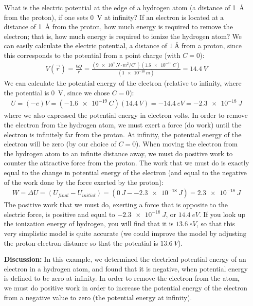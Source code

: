 \begin{example}{What is the electric potential at the edge of a hydrogen atom (a distance of \SI{1}{\angstrom} from the proton), if one sets \SI{0}{V} at infinity? If an electron is located at a distance of \SI{1}{\angstrom} from the proton, how much energy is required to remove the electron; that is, how much energy is required to ionize the hydrogen atom?}
We can easily calculate the electric potential, a distance of $\SI{1}{\angstrom}$ from a proton, since this corresponds to the potential from a point charge (with $C=0$):
\begin{align*}
V(\vec r)=\frac{kQ}{r}=\frac{(\SI{9e9}{N\cdot m^2/C^{2}})(\SI{1.6e-19}{C})}{(\SI{1e-10}{m})}=\SI{14.4}{V}
\end{align*}
We can calculate the potential energy of the electron (relative to infinity, where the potential is \SI{0}{V}, since we chose $C=0$):
\begin{align*}
U=(-e)V=(\SI{-1.6e-19}{C})(\SI{14.4}{V})=-\SI{14.4}{eV}=\SI{-2.3e-18}{J}
\end{align*}
where we also expressed the potential energy in electron volts. In order to remove the electron from the hydrogen atom, we must exert a force (do work) until the electron is infinitely far from the proton. At infinity, the potential energy of the electron will be zero (by our choice of $C=0$). When moving the electron from the hydrogen atom to an infinite distance away, we must do positive work to counter the attractive force from the proton. The work that we must do is exactly equal to the change in potential energy of the electron (and equal to the negative of the work done by the force exerted by the proton):
\begin{align*}
W=\Delta U=(U_{final}-U_{initial})=(\SI{0}{J}-\SI{-2.3e-18}{J})=\SI{2.3e-18}{J}
\end{align*}
The positive work that we must do, exerting a force that is opposite to the electric force, is positive and equal to $\SI{-2.3e-18}{J}$, or $\SI{14.4}{eV}$. If you look up the ionization energy of hydrogen, you will find that it is $\SI{13.6}{eV}$, so that this very simplistic model is quite accurate (we could improve the model by adjusting the proton-electron distance so that the potential is $\SI{13.6}{V}$). 

\textbf{Discussion:} In this example, we determined the electrical potential energy of an electron in a hydrogen atom, and found that it is negative, when potential energy is defined to be zero at infinity. In order to remove the electron from the atom, we must do positive work in order to increase the potential energy of the electron from a negative value to zero (the potential energy at infinity). 
\end{example}

